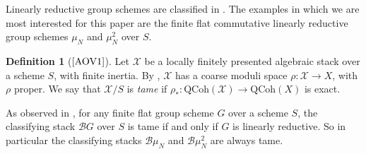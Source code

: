 \documentclass[11pt]{amsart}
\theoremstyle{definition}
\newtheorem{definition}[subsection]{Definition}
\begin{document}
Linearly reductive group schemes are classified in \cite[\S2.3]{AOV1}. The examples in which we are most interested for this paper are the finite flat commutative linearly reductive group schemes $\mu_N$ and $\mu_N^2$ over $S$.

\begin{definition}[$\textrm{\cite[3.1]{AOV1}}$]
Let $\mathcal{X}$ be a locally finitely presented algebraic stack over a scheme $S$, with finite inertia. By \cite{KM2}, $\mathcal{X}$ has a coarse moduli space $\rho: \mathcal{X} \rightarrow X$, with $\rho$ proper. We say that $\mathcal{X}/S$ is \textit{tame} if $\rho_*: \mathrm{QCoh}(\mathcal{X}) \rightarrow \mathrm{QCoh}(X)$ is exact.
\end{definition}

As observed in \cite[\S3]{AOV1}, for any finite flat group scheme $G$ over a scheme $S$, the classifying stack ${\mathcal{B}} G$ over $S$ is tame if and only if $G$ is linearly reductive. So in particular the classifying stacks ${\mathcal{B}}\mu_N$ and ${\mathcal{B}}\mu_N^2$ are always tame.
\end{document}
